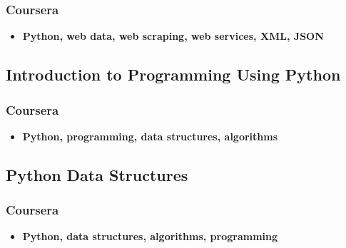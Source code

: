 \documentclass[11pt]{article}
\begin{document}
\subsubsection{Coursera}
\begin{itemize}
    \item[\textbullet] \textbf{Python, web data, web scraping, web services, XML, JSON}
\end{itemize}
\subsection{Introduction to Programming Using Python \hfill {}}
\subsubsection{Coursera}
\begin{itemize}
    \item[\textbullet] \textbf{Python, programming, data structures, algorithms}
\end{itemize}
\subsection{Python Data Structures \hfill {}}
\subsubsection{Coursera}
\begin{itemize}
    \item[\textbullet] \textbf{Python, data structures, algorithms, programming}
\end{itemize}
\end{document}
